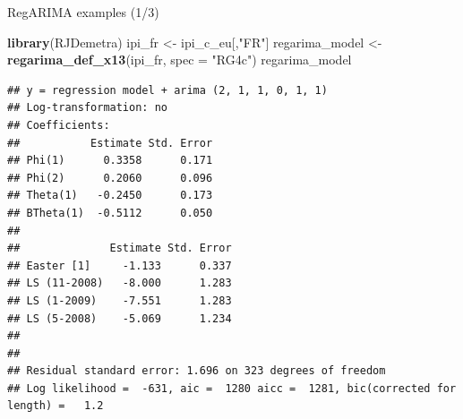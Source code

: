 \documentclass[10pt,xcolor=table,color={dvipsnames,usenames},ignorenonframetext,usepdftitle=false,french]{beamer}
\newenvironment{Shaded}{\begin{snugshade}}{\end{snugshade}}
\newcommand{\DataTypeTok}[1]{\textcolor[rgb]{0.13,0.29,0.53}{#1}}
\newcommand{\KeywordTok}[1]{\textcolor[rgb]{0.13,0.29,0.53}{\textbf{#1}}}
\newcommand{\NormalTok}[1]{#1}
\newcommand{\StringTok}[1]{\textcolor[rgb]{0.31,0.60,0.02}{#1}}
\begin{document}
\begin{frame}[fragile]{RegARIMA examples (1/3)}
\protect\hypertarget{regarima-examples-13}{}

\footnotesize

\begin{Shaded}
\begin{Highlighting}[]
\KeywordTok{library}\NormalTok{(RJDemetra)}
\NormalTok{ipi_fr <-}\StringTok{ }\NormalTok{ipi_c_eu[,}\StringTok{"FR"}\NormalTok{]}
\NormalTok{regarima_model <-}\StringTok{ }\KeywordTok{regarima_def_x13}\NormalTok{(ipi_fr, }\DataTypeTok{spec =} \StringTok{"RG4c"}\NormalTok{)}
\NormalTok{regarima_model}
\end{Highlighting}
\end{Shaded}

\begin{verbatim}
## y = regression model + arima (2, 1, 1, 0, 1, 1)
## Log-transformation: no
## Coefficients:
##           Estimate Std. Error
## Phi(1)      0.3358      0.171
## Phi(2)      0.2060      0.096
## Theta(1)   -0.2450      0.173
## BTheta(1)  -0.5112      0.050
## 
##              Estimate Std. Error
## Easter [1]     -1.133      0.337
## LS (11-2008)   -8.000      1.283
## LS (1-2009)    -7.551      1.283
## LS (5-2008)    -5.069      1.234
## 
## 
## Residual standard error: 1.696 on 323 degrees of freedom
## Log likelihood =  -631, aic =  1280 aicc =  1281, bic(corrected for length) =   1.2
\end{verbatim}

\end{frame}
\end{document}
